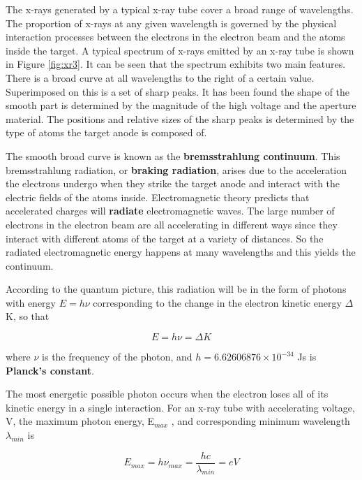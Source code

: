 The x-rays generated by a typical x-ray tube cover a broad range of wavelengths. The proportion of x-rays at any given wavelength is governed by the physical interaction processes between the electrons in the electron beam and the atoms inside the target. A typical spectrum of x-rays emitted by an x-ray tube is shown in Figure \ref{fig:xr3}. It can be seen that the spectrum exhibits two main features. There is a broad curve at all wavelengths to the right of a certain value. Superimposed on this is a set of sharp peaks. It has been found the shape of the smooth part is determined by the magnitude of the high voltage and the aperture material. The positions and relative sizes of the sharp peaks is determined by the type of atoms the target anode is composed of.

The smooth broad curve is known as the {\bf bremsstrahlung continuum}. This bremsstrahlung radiation, or {\bf braking radiation}, arises due to the acceleration the electrons undergo when they strike the target anode and interact with the electric fields of the atoms inside. Electromagnetic theory predicts that accelerated charges will {\bf radiate} electromagnetic waves. The large number of electrons in the electron beam are all accelerating in different ways since they interact with different atoms of the target at a variety of distances. So the radiated electromagnetic energy happens at many wavelengths and this yields the continuum.

According to the quantum picture, this radiation will be in the form of photons with energy $E = h\nu$ corresponding to the change in the electron kinetic energy $\Delta$ K, so that

\begin{equation}
E=h\nu =\Delta K
\label{equ:xr1}
\end{equation}

\noindent where $\nu$ is the frequency of the photon, and $h = 6.62606876\times10^{-34}$ Js is {\bf Planck's constant}.

The most energetic possible photon occurs when the electron loses all of its kinetic energy in a single interaction. For an x-ray tube with accelerating voltage, V, the maximum photon energy, E$_{max}$ , and corresponding minimum wavelength $\lambda_{min}$ is

\begin{equation}
E_{max}=h\nu_{max}=\dfrac{hc}{\lambda_{min}}=eV
\label{equ:xr2}
\end{equation}

